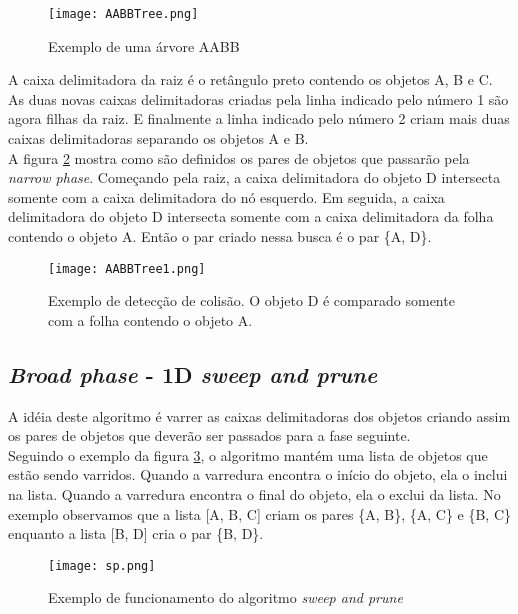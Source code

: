 \begin{figure}[!htbp]
  \texttt{[image: AABBTree.png]}
  \caption{Exemplo de uma árvore AABB}
  \label{aabb}
\end{figure}

A caixa delimitadora da raiz é o retângulo preto contendo os objetos A, B e C.
As duas novas caixas delimitadoras criadas pela linha indicado pelo número 1 são agora filhas da raiz. 
E finalmente a linha indicado pelo número 2 criam mais duas caixas delimitadoras separando os objetos A e B.\\

A figura \ref{aabbTree} mostra como são definidos os pares de objetos que passarão pela \textit{narrow phase}. Começando pela raiz, a caixa delimitadora do objeto D intersecta somente 
com a caixa delimitadora do nó esquerdo. Em seguida, a caixa delimitadora do objeto D intersecta somente com a caixa delimitadora da folha contendo o objeto A.
Então o par criado nessa busca é o par \{A, D\}.

\begin{figure}[H]
  \texttt{[image: AABBTree1.png]}
  \caption{Exemplo de detecção de colisão. O objeto D é comparado somente com a folha contendo o objeto A.}
  \label{aabbTree}
\end{figure}

\subsection{\textit{Broad phase} - 1D \textit{sweep and prune}}

A idéia deste algoritmo é varrer as caixas delimitadoras dos objetos criando assim os pares de objetos que deverão ser passados para a fase seguinte. \\

Seguindo o exemplo da figura \ref{sweep}, o algoritmo mantém uma lista de objetos que estão sendo varridos. Quando a varredura encontra o início do objeto, ela o inclui na lista. 
Quando a varredura encontra o final do objeto, ela o exclui da lista. No exemplo observamos que a lista [A, B, C] criam os pares \{A, B\}, \{A, C\} e \{B, C\} 
enquanto a lista [B, D] cria o par \{B, D\}. \\

\begin{figure}[!htbp]
  \centering
  \texttt{[image: sp.png]}
  \caption{Exemplo de funcionamento do algoritmo \textit{sweep and prune} \protect\cite{broad:sweep}}
  \label{sweep}
\end{figure}

